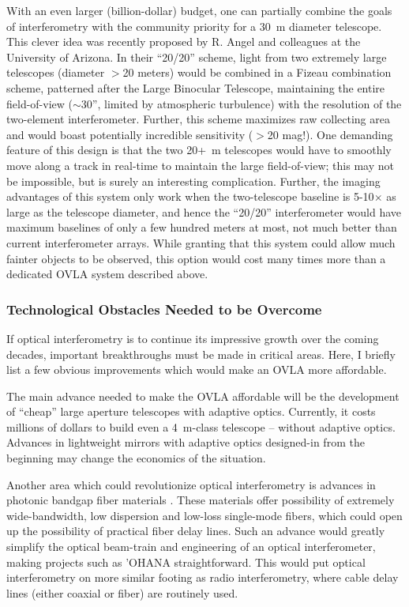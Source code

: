 \documentclass[12pt]{iopart}
\begin{document}
With an even larger (billion-dollar) budget, one can partially combine
the goals of interferometry with the community priority for a 30~m
diameter telescope.  This clever idea was recently proposed by R.
Angel and colleagues at the University of Arizona.  In their ``20/20''
scheme, light from two extremely large telescopes (diameter $>$20
meters) would be combined in a Fizeau combination scheme, patterned
after the Large Binocular Telescope, maintaining the entire
field-of-view ($\sim$30'', limited by atmospheric turbulence) with the
resolution of the two-element interferometer.  Further, this scheme
maximizes raw collecting area and would boast potentially incredible
sensitivity ($>$20 mag!).  One demanding feature of this design is
that the two 20+~m telescopes would have to smoothly move along a
track in real-time to maintain the large field-of-view; this may not
be impossible, but is surely an interesting complication.  Further,
the imaging advantages of this system only work when the two-telescope
baseline is 5-10$\times$ as large as the telescope diameter, and hence
the ``20/20'' interferometer would have maximum baselines of only a
few hundred meters at most, not much better than current
interferometer arrays.  While granting that this system could allow
much fainter objects to be observed, this option would cost many times
more than a dedicated OVLA system described above.

\subsubsection{Technological Obstacles Needed to be Overcome}
If optical interferometry is to continue its impressive growth over
the coming decades, important breakthroughs must be made in critical
areas.  Here, I briefly list a few obvious improvements
which would make an OVLA more affordable.

The main advance needed to make the OVLA affordable will be the
development of ``cheap'' large aperture telescopes with adaptive
optics.  Currently, it costs millions of dollars to build even a
4~m-class telescope -- without adaptive optics.  Advances in lightweight
mirrors with adaptive optics designed-in from the beginning may change
the economics of the situation.  

Another area which could revolutionize optical interferometry is
advances in photonic bandgap fiber materials
\citep[e.g.,][]{mueller2002}.  These materials offer possibility of
extremely wide-bandwidth, low dispersion and low-loss single-mode
fibers, which could open up the possibility of practical fiber delay
lines. Such an advance would greatly simplify the optical beam-train
and engineering of an optical interferometer, making projects such as
'OHANA straightforward.  This would put optical interferometry on more similar
footing as radio interferometry, where cable delay lines (either
coaxial or fiber) are routinely used.
\end{document}
